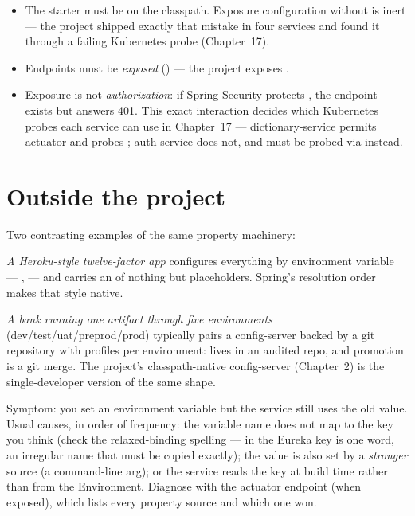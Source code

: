 \begin{itemize}
  \item The starter must be on the classpath. Exposure configuration
  without  is inert --- the project
  shipped exactly that mistake in four services and found it through a
  failing Kubernetes probe (Chapter~17).
  \item Endpoints must be \emph{exposed}
  () --- the project
  exposes .
  \item Exposure is not \emph{authorization}: if Spring Security protects
  , the endpoint exists but answers 401. This
  exact interaction decides which Kubernetes probes each service can use
  in Chapter~17 --- dictionary-service permits actuator and probes
  ; auth-service does not, and must be probed via
   instead.
\end{itemize}

\section{Outside the project}

Two contrasting examples of the same property machinery:

\emph{A Heroku-style twelve-factor app} configures everything by
environment variable --- ,  --- and carries
an  of nothing but  placeholders.
Spring's resolution order makes that style native.

\emph{A bank running one artifact through five environments}
(dev/test/uat/preprod/prod) typically pairs a config-server backed by a
git repository with profiles per environment:
 lives in an audited repo, and promotion is a
git merge. The project's classpath-native config-server (Chapter~2) is
the single-developer version of the same shape.

\begin{pitfall}
Symptom: you set an environment variable but the service still uses the
old value. Usual causes, in order of frequency: the variable name does
not map to the key you think (check the relaxed-binding spelling ---
 in the Eureka key is one word, an irregular name that
must be copied exactly); the value is also set by a \emph{stronger}
source (a command-line arg); or the service reads the key at build time
rather than from the Environment. Diagnose with the actuator
 endpoint (when exposed), which lists every property
source and which one won.
\end{pitfall}

